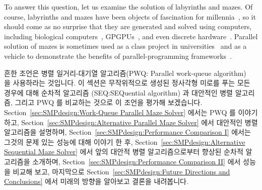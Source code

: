 To answer this question, let us examine the solution of
labyrinths and mazes.
Of course, labyrinths and mazes have been objects of fascination for
millennia~\cite{WikipediaLabyrinth},
so it should come as no surprise that they are generated and solved
using computers, including biological
computers~\cite{AndrewAdamatzky2011SlimeMold},
GPGPUs~\cite{ChristerEricson2008GPUMaze}, and even
discrete hardware~\cite{MIT:TRMag:MemristorMazes}.
Parallel solution of mazes is sometimes used as a class project in
universities~\cite{ETHZurich:FS2011maze,UMD:CMSC433maze} and
as a vehicle to demonstrate the benefits of parallel-programming
frameworks~\cite{RonFosner2010maze}.
\fi

흔한 조언은 병렬 일거리-대기열 알고리즘(PWQ: Parallel work-queue
algorithm)~\cite{ETHZurich:FS2011maze,RonFosner2010maze} 을 사용하라는
것입니다.
이 섹션은 무작위적으로 생성된 정사각형 미로를 푸는 모든 경우에 대해
순차적 알고리즘 (SEQ:SEQuential algorithm) 과 대안적인 병렬 알고리즘, 그리고
PWQ 를 비교하는 것으로 이 조언을 평가해 보겠습니다.
Section~\ref{sec:SMPdesign:Work-Queue Parallel Maze Solver} 에서는 PWQ 를
이야기 하고,
Section~\ref{sec:SMPdesign:Alternative Parallel Maze Solver} 에서 대안적인 병렬
알고리즘을 설명하며,
Section~\ref{sec:SMPdesign:Performance Comparison I} 에서는 그것의 문제 있는
성능에 대해 이야기 한 후,
Section~\ref{sec:SMPdesign:Alternative Sequential Maze Solver} 에서 앞의 대안적
병렬 알고리즘으로부터 향상된 순차적 알고리즘을 소개하며,
Section~\ref{sec:SMPdesign:Performance Comparison II} 에서 성능을 비교해 보고,
마지막으로
Section~\ref{sec:SMPdesign:Future Directions and Conclusions} 에서 미래의
방향을 알아보고 결론을 내려봅니다.

